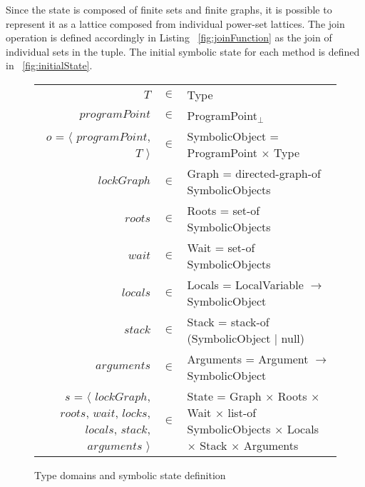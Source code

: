 Since the state is composed of finite sets and finite graphs, it is possible to represent it as a lattice composed from individual power-set lattices. The join operation is defined accordingly in Listing ~\ref{fig:joinFunction} as the join of individual sets in the tuple. The initial symbolic state for each method is defined in ~\ref{fig:initialState}.

\begin{figure}
\begin{tabulary}{\textwidth}{ R C L }
$T$ & $\in$ & Type \\
$programPoint$ & $\in$ & ProgramPoint$_\bot$ \\
$o$ = $\langle$ $programPoint$, $T$ $\rangle$ & $\in$ & SymbolicObject = ProgramPoint $\times$ Type \\
$lockGraph$ & $\in$ & Graph = directed-graph-of SymbolicObjects \\
$roots$ & $\in$ & Roots = set-of SymbolicObjects \\
$wait$ & $\in$ & Wait = set-of SymbolicObjects \\
$locals$ & $\in$ & Locals = LocalVariable $\rightarrow$ SymbolicObject \\
$stack$ & $\in$ & Stack = stack-of (SymbolicObject $|$ null) \\
$arguments$ & $\in$ & Arguments = Argument $\rightarrow$ SymbolicObject \\
$s$ = $\langle$ $lockGraph$, $roots$, $wait$, $locks$, $locals$, $stack$, $arguments$ $\rangle$ & $\in$ & State = Graph $\times$ Roots $\times$ Wait $\times$ list-of SymbolicObjects $\times$ Locals $\times$ Stack $\times$ Arguments \\
\end{tabulary}
\caption{Type domains and symbolic state definition}
\label{fig:symbolicState} 
\end{figure}

